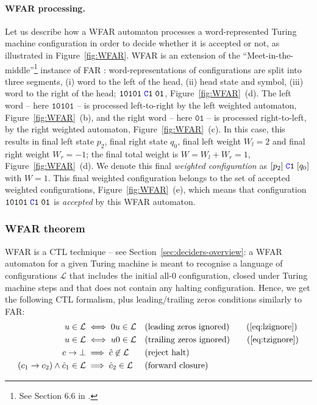 \paragraph{WFAR processing.} Let us describe how a WFAR automaton processes a word-represented Turing machine configuration in order to decide whether it is accepted or not, as illustrated in Figure~\ref{fig:WFAR}. WFAR is an extension of the ``Meet-in-the-middle''\footnote{See Section 6.6 in \cite{bbchallenge_part1}.} instance of FAR \cite{bbchallenge_part1}: word-representations of configurations are split into three segments, (i) word to the left of the head, (ii) head state and symbol, (iii) word to the right of the head; \eg $\texttt{10101}\; \texttt{\stateC}\sone\; \texttt{01}$, Figure~\ref{fig:WFAR}~(d). The left word -- here $\texttt{10101}$ -- is processed left-to-right by the left weighted automaton, Figure~\ref{fig:WFAR}~(b), and the right word -- here $\texttt{01}$ -- is processed right-to-left, by the right weighted automaton, Figure~\ref{fig:WFAR}~(c). In this case, this results in final left state $p_2$, final right state $q_0$, final left weight $W_l = 2$ and final right weight $W_r = -1$; the final total weight is $W = W_l + W_r = 1$, Figure~\ref{fig:WFAR}~(d). We denote this final \textit{weighted configuration} as $[p_2]\; \texttt{\stateC}\sone\; [q_0]$ with $W=1$. This final weighted configuration belongs to the set of accepted weighted configurations, Figure~\ref{fig:WFAR}~(e), which means that configuration $\texttt{10101}\; \texttt{\stateC}\sone\; \texttt{01}$ is \textit{accepted} by this WFAR automaton.


\subsubsection{WFAR theorem}

WFAR is a CTL technique -- see Section~\ref{sec:deciders-overview}: a WFAR automaton for a given Turing machine is meant to recognise a language of configurations $\mathcal{L}$ that includes the initial all-0 configuration, closed under Turing machine steps and that does not contain any halting configuration. Hence, we get the following CTL formalism, plus leading/trailing zeros conditions similarly to FAR:
\begin{align}
    u \in \mathcal{L}                               & \iff 0u \in \mathcal{L}               &  & \text{(leading zeros ignored)}
    \tag{\ref{eq:lzignore}}
    \\
    u \in \mathcal{L}                               & \iff u0 \in \mathcal{L}               &  & \text{(trailing zeros ignored)}
    \tag{\ref{eq:tzignore}}
    \\
    c\TMstep\bot                                    & \implies \hat{c} \not \in \mathcal{L} &  & \text{(reject halt)} \label{eq:rejecthalt}     \\
    (c_1\TMstep c_2)\land \hat{c}_1 \in \mathcal{L} & \implies\hat{c}_2 \in \mathcal{L}     &  & \text{(forward closure)} \label{eq:forwardclo}
\end{align}

